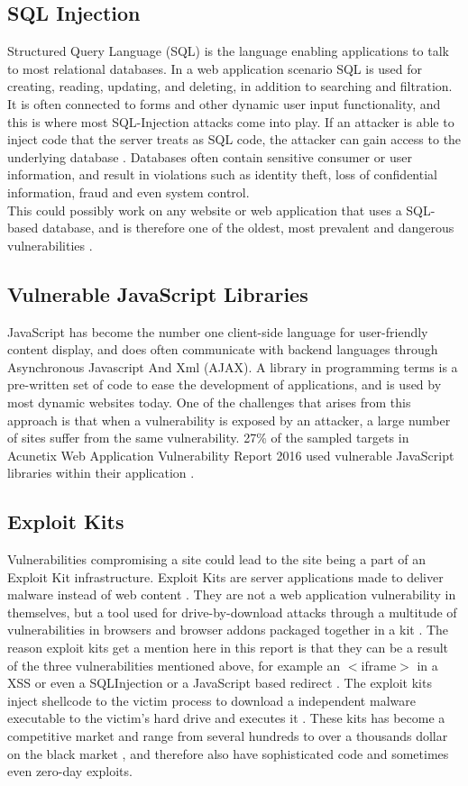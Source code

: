 \subsection{SQL Injection}
Structured Query Language (SQL) is the language enabling applications to talk to most relational databases. In a web application scenario SQL is used for creating, reading, updating, and deleting, in addition to searching and filtration. It is often connected to forms and other dynamic user input functionality, and this is where most SQL-Injection attacks come into play. If an attacker is able to inject code that the server treats as SQL code, the attacker can gain access to the underlying database \cite{Bisson2005}. Databases often contain sensitive consumer or user information, and result in violations such as identity theft, loss of confidential information, fraud and even system control.
\\ This could possibly work on any website or web application that uses a SQL-based database, and is therefore one of the oldest, most prevalent and dangerous vulnerabilities \cite{Acunetix2016}.
\subsection{Vulnerable JavaScript Libraries}
JavaScript has become the number one client-side language for user-friendly content display, and does often communicate with backend languages through Asynchronous Javascript And Xml (AJAX). A library in programming terms is a pre-written set of code to ease the development of applications, and is used by most dynamic websites today. One of the challenges that arises from this approach is that when a vulnerability is exposed by an attacker, a large number of sites suffer from the same vulnerability.
27\% of the sampled targets in Acunetix Web Application Vulnerability Report 2016 used vulnerable JavaScript libraries within their application \cite{Acunetix2016}. 
\subsection{Exploit Kits}
Vulnerabilities compromising a site could lead to the site being a part of an Exploit Kit infrastructure. Exploit Kits are server applications made to deliver malware instead of web content \cite{Preuss2011}. They are not a web application vulnerability in themselves, but a tool used for drive-by-download attacks through a multitude of vulnerabilities in browsers and browser addons packaged together in a kit \cite{Kotov2013}. The reason exploit kits get a mention here in this report is that they can be a result of the three vulnerabilities mentioned above, for example an $<$iframe$>$ in a XSS or even a SQLInjection or a JavaScript based redirect \cite{Preuss2011}.
The exploit kits inject shellcode to the victim process to download a independent malware executable to the victim's hard drive and executes it \cite{Preuss2011}.
These kits has become a competitive market and range from several hundreds to over a thousands dollar on the black market \cite{Preuss2011}, and therefore also have sophisticated code and sometimes even zero-day exploits.
